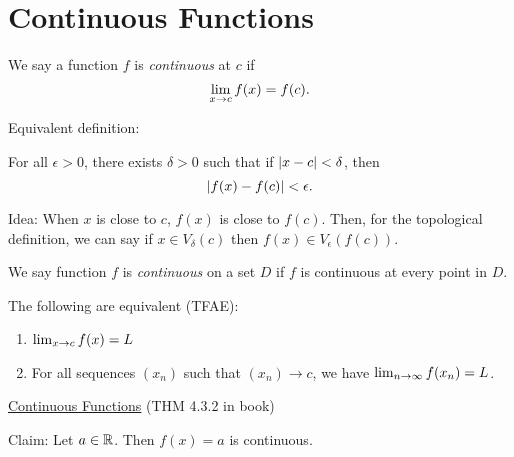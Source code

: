 

\renewcommand{\theenumi}{\arabic{enumi}}
\renewcommand{\labelenumi}{\theenumi.}

\section{Continuous Functions}

\begin{definition}
    We say a function \(f\) is \textit{continuous} at \(c\) if
    \[
        \lim_{x \rightarrow c}f(x) = f(c).
    \]

    Equivalent definition:

    For all \(\epsilon > 0\), there exists \(\delta > 0\) such that if \(\left|x - c\right| < \delta\), then
    \[
        \left|f(x) - f(c)\right| < \epsilon.
    \]
\end{definition}

Idea: When \(x\) is close to \(c\), \(f(x)\) is close to \(f(c)\). Then, for the topological definition, we can say if \(x \in V_\delta(c)\) then \(f(x) \in V_\epsilon(f(c))\).

\begin{definition}
    We say function \(f\) is \textit{continuous} on a set \(D\) if \(f\) is continuous at every point in \(D\).
\end{definition}

The following are equivalent (TFAE):

\begin{enumerate}
    \item \(\lim_{x \rightarrow c}f(x) = L\)
    \item For all sequences \((x_n)\) such that \((x_n) \rightarrow c\), we have \(\lim_{n \rightarrow \infty}f(x_n) = L\).
\end{enumerate}

\begin{center}
    \underline{Continuous Functions} (THM 4.3.2 in book)
\end{center}

Claim: Let \(a \in \mathbb{R}\). Then \(f(x) = a\) is continuous.

